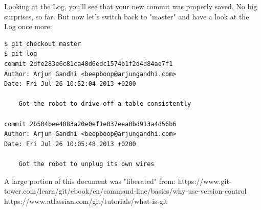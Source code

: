 \documentclass{article}
\begin{document}
Looking at the Log, you'll see that your new commit was properly saved. No big surprises, so far. But now let's switch back to "master" and have a look at the Log once more:
\begin{lstlisting}
$ git checkout master
$ git log
commit 2dfe283e6c81ca48d6edc1574b1f2d4d84ae7f1
Author: Arjun Gandhi <beepboop@arjungandhi.com>
Date: Fri Jul 26 10:52:04 2013 +0200

    Got the robot to drive off a table consistently

commit 2b504bee4083a20e0ef1e037eea0bd913a4d56b6
Author: Arjun Gandhi <beepboop@arjungandhi.com>
Date: Fri Jul 26 10:05:48 2013 +0200

    Got the robot to unplug its own wires
\end{lstlisting}

\begin{thebibliography}{9}
A large portion of this document was "liberated" from:
https://www.git-tower.com/learn/git/ebook/en/command-line/basics/why-use-version-control
https://www.atlassian.com/git/tutorials/what-is-git
\end{thebibliography}
\end{document}

